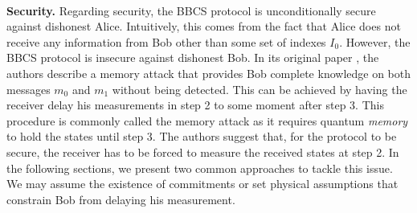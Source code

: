\

\noindent\textbf{Security.} Regarding security, the BBCS protocol is unconditionally secure against dishonest Alice. Intuitively, this comes from the fact that Alice does not receive any information from Bob other than some set of indexes $I_0$. However, the BBCS protocol is insecure against dishonest Bob. In its original paper \cite{BBCS92}, the authors describe a memory attack that provides Bob complete knowledge on both messages $m_0$ and $m_1$ without being detected. This can be achieved by having the receiver delay his measurements in step 2 to some moment after step 3. This procedure is commonly called the memory attack as it requires quantum \textit{memory} to hold the states until step 3. The authors suggest that, for the protocol to be secure, the receiver has to be forced to measure the received states at step 2. In the following sections, we present two common approaches to tackle this issue. We may assume the existence of commitments or set physical assumptions that constrain Bob from delaying his measurement.


%
%
%